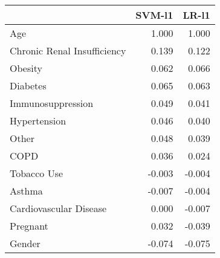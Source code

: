 \begin{tabular}{lrr}
\toprule
{} &  SVM-l1 &  LR-l1 \\
\midrule
Age                         &   1.000 &  1.000 \\
Chronic Renal Insufficiency &   0.139 &  0.122 \\
Obesity                     &   0.062 &  0.066 \\
Diabetes                    &   0.065 &  0.063 \\
Immunosuppression           &   0.049 &  0.041 \\
Hypertension                &   0.046 &  0.040 \\
Other                       &   0.048 &  0.039 \\
COPD                        &   0.036 &  0.024 \\
Tobacco Use                 &  -0.003 & -0.004 \\
Asthma                      &  -0.007 & -0.004 \\
Cardiovascular Disease      &   0.000 & -0.007 \\
Pregnant                    &   0.032 & -0.039 \\
Gender                      &  -0.074 & -0.075 \\
\bottomrule
\end{tabular}
